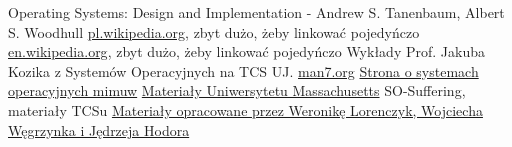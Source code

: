 \documentclass[12pt, a4paper, polish, openany]{book}
\begin{document}
\begin{thebibliography}{3}
Operating Systems: Design and Implementation - Andrew S. Tanenbaum, Albert S. Woodhull
\href{https://pl.wikipedia.org/}{pl.wikipedia.org}, zbyt dużo, żeby linkować pojedyńczo
\href{https://en.wikipedia.org/}{en.wikipedia.org}, zbyt dużo, żeby linkować pojedyńczo
Wykłady Prof. Jakuba Kozika z Systemów Operacyjnych na TCS UJ.
\href{https://man7.org/linux/}{man7.org}
\href{https://students.mimuw.edu.pl/~mk371127/documents/7/przeczytaj_mnie.html}{Strona o systemach operacyjnych mimuw}
\href{https://lass.cs.umass.edu/~shenoy/courses/spring20/lectures/Lec11.pdf}{Materiały Uniwersytetu Massachusetts}
SO-Suffering, materiały TCSu
\href{https://matematykawmiiuj.wordpress.com/systemy-operacyjne/}{Materiały opracowane przez Weronikę Lorenczyk, Wojciecha Węgrzynka i Jędrzeja Hodora}
\end{thebibliography}
\end{document}
